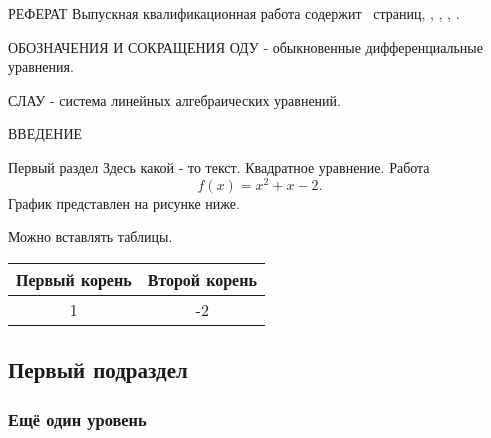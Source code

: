 \documentclass[14pt, a4paper, oneside, final]{extarticle}
\begin{document}
\begin{gostabstract}{РЕФЕРАТ}
Выпускная квалификационная работа содержит \pageref*{LastPage}~страниц, \printtotfig, \printtottab, \printtotapp, \printtotref .
\end{gostabstract}


\gosttableofcontents


\begin{lofab}{ОБОЗНАЧЕНИЯ И СОКРАЩЕНИЯ}
ОДУ - обыкновенные дифференциальные уравнения.

СЛАУ - система линейных алгебраических уравнений.
\end{lofab}


\begin{gostheader}{ВВЕДЕНИЕ}
\end{gostheader}


\mainpart


\begin{gostsection}{Первый раздел}
Здесь какой - то текст. Квадратное уравнение. \textsf{Работа}
\begin{equation}
f(x) = x^2 + x-2.
\end{equation}
График представлен на рисунке ниже.
\begin{gostfigure}
\begin{center} 
\end{center}
\end{gostfigure}

Можно вставлять таблицы.
\begin{gosttable}
\begin{center} 
\begin{tabular}{|c|c|}
\hline 
Первый корень &  Второй корень \\ 
\hline 
1 & -2  \\ 
\hline 
\end{tabular} 
\end{center}
\end{gosttable}


\subsection{Первый подраздел}

\subsubsection{Ещё один уровень}

\end{gostsection}
\end{document}
